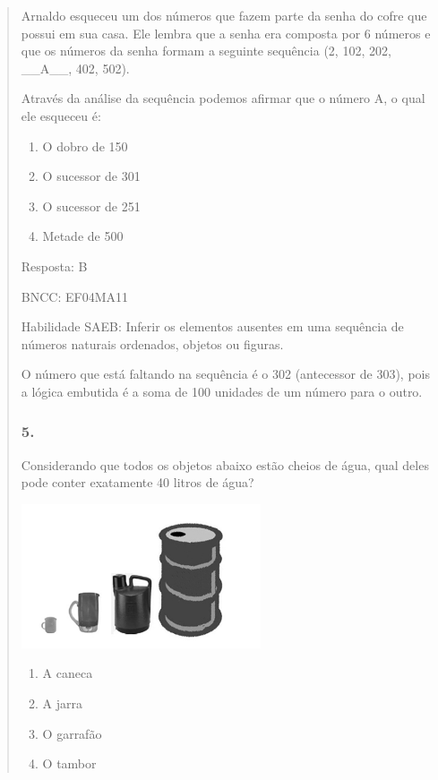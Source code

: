 \begin{enumerate}
\begin{escolha}
\begin{enumerate}
\begin{itemize}
\begin{itemize}
\begin{escolha}
\begin{quote}
\begin{escolha}
{Arnaldo esqueceu um dos números que fazem parte da senha do cofre que
possui em sua casa. Ele lembra que a senha era composta por 6 números e
que os números da senha formam a seguinte sequência (2, 102, 202,
\_\_A\_\_, 402, 502).

Através da análise da sequência podemos afirmar que o número A, o qual
ele esqueceu é:

\begin{enumerate}
\def\labelenumi{\alph{enumi})}
\item
  O dobro de 150
\item
  O sucessor de 301
\item
  O sucessor de 251
\item
  Metade de 500
\end{enumerate}

Resposta: B

BNCC: EF04MA11

Habilidade SAEB: Inferir os elementos ausentes em uma sequência de
números naturais ordenados, objetos ou figuras.

O número que está faltando na sequência é o 302 (antecessor de 303),
pois a lógica embutida é a soma de 100 unidades de um número para o
outro.

\subsubsection{5. }\label{section-191}

Considerando que todos os objetos abaixo estão cheios de água, qual
deles pode conter exatamente 40 litros de água?

\includegraphics[width=2.78846in,height=1.67526in]{media/image166.png}

\begin{enumerate}
\def\labelenumi{\alph{enumi})}
\item
  A caneca
\item
  A jarra
\item
  O garrafão
\item
  O tambor
\end{enumerate}

}
\end{escolha}
\end{quote}
\end{escolha}
\end{itemize}
\end{itemize}
\end{enumerate}
\end{escolha}
\end{enumerate}
